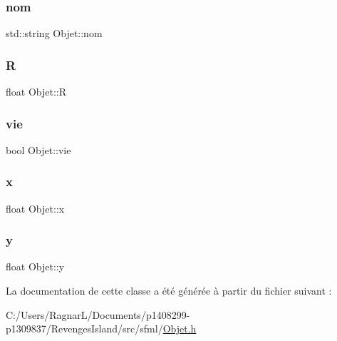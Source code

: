 \subsubsection{\texorpdfstring{nom}{nom}}
{\footnotesize\ttfamily std\+::string Objet\+::nom}

\mbox{\label{class_objet_ac931833c077df49ec3f909aba38e0121}} 
\subsubsection{\texorpdfstring{R}{R}}
{\footnotesize\ttfamily float Objet\+::R}

\mbox{\label{class_objet_a50498a805e7a5db752bf5bfd9fbb7b5b}} 
\subsubsection{\texorpdfstring{vie}{vie}}
{\footnotesize\ttfamily bool Objet\+::vie}

\mbox{\label{class_objet_a2c73c2c45d5339df8228966b655351de}} 
\subsubsection{\texorpdfstring{x}{x}}
{\footnotesize\ttfamily float Objet\+::x}

\mbox{\label{class_objet_a875f758fbf6434825b3acdc011b362a2}} 
\subsubsection{\texorpdfstring{y}{y}}
{\footnotesize\ttfamily float Objet\+::y}



La documentation de cette classe a été générée à partir du fichier suivant \+:\begin{DoxyCompactItemize}
\item 
C\+:/\+Users/\+Ragnar\+L/\+Documents/p1408299-\/p1309837/\+Revenges\+Island/src/sfml/\hyperlink{_objet_8h}{Objet.\+h}\end{DoxyCompactItemize}
